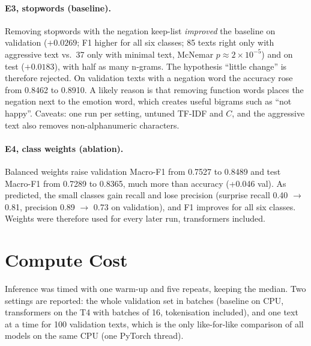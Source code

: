 \documentclass[11pt,a4paper]{article}
\begin{document}
\paragraph{E3, stopwords (baseline).} Removing stopwords with the negation keep-list \emph{improved} the baseline on validation ($+0.0269$; F1 higher for all six classes; 85 texts right only with aggressive text vs.\ 37 only with minimal text, McNemar $p\approx2\times10^{-5}$) and on test ($+0.0183$), with half as many n-grams. The hypothesis ``little change'' is therefore rejected. On validation texts with a negation word the accuracy rose from 0.8462 to 0.8910. A likely reason is that removing function words places the negation next to the emotion word, which creates useful bigrams such as ``not happy''. Caveats: one run per setting, untuned TF-IDF and $C$, and the aggressive text also removes non-alphanumeric characters.

\paragraph{E4, class weights (ablation).} Balanced weights raise validation Macro-F1 from 0.7527 to 0.8489 and test Macro-F1 from 0.7289 to 0.8365, much more than accuracy (+0.046 val). As predicted, the small classes gain recall and lose precision (surprise recall 0.40 $\rightarrow$ 0.81, precision 0.89 $\rightarrow$ 0.73 on validation), and F1 improves for all six classes. Weights were therefore used for every later run, transformers included.

\section{Compute Cost}
\label{sec:cost}
Inference was timed with one warm-up and five repeats, keeping the median. Two settings are reported: the whole validation set in batches (baseline on CPU, transformers on the T4 with batches of 16, tokenisation included), and one text at a time for 100 validation texts, which is the only like-for-like comparison of all models on the same CPU (one PyTorch thread).
\end{document}
